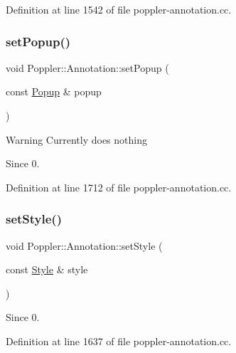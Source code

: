 Definition at line 1542 of file poppler-\/annotation.\+cc.

\mbox{\label{class_poppler_1_1_annotation_a583671f690f965995b9be23554722900}} 
\subsubsection{\texorpdfstring{set\+Popup()}{setPopup()}}
{\footnotesize\ttfamily void Poppler\+::\+Annotation\+::set\+Popup (\begin{DoxyParamCaption}\item[{const \hyperlink{class_poppler_1_1_annotation_1_1_popup}{Popup} \&}]{popup }\end{DoxyParamCaption})}

\begin{DoxyWarning}{Warning}
Currently does nothing 
\end{DoxyWarning}
\begin{DoxySince}{Since}
0. 
\end{DoxySince}


Definition at line 1712 of file poppler-\/annotation.\+cc.

\mbox{\label{class_poppler_1_1_annotation_afa93b9a0da6de47a74b5e296924afc42}} 
\subsubsection{\texorpdfstring{set\+Style()}{setStyle()}}
{\footnotesize\ttfamily void Poppler\+::\+Annotation\+::set\+Style (\begin{DoxyParamCaption}\item[{const \hyperlink{class_poppler_1_1_annotation_1_1_style}{Style} \&}]{style }\end{DoxyParamCaption})}

\begin{DoxySince}{Since}
0. 
\end{DoxySince}


Definition at line 1637 of file poppler-\/annotation.\+cc.

\mbox{\label{class_poppler_1_1_annotation_aa2e24fbf5e2cd28af8e1b62876c39663}} 
